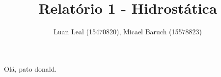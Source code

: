 \documentclass{article}
\author{Luan Leal (15470820), Micael Baruch (15578823)}
\title{Relatório 1 - Hidrostática}
\begin{document}
\maketitle

    
    
    
    

Olá, pato donald.

    
\end{document}
